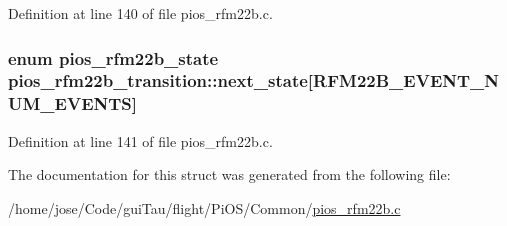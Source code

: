 Definition at line 140 of file pios\-\_\-rfm22b.\-c.

\hypertarget{structpios__rfm22b__transition_a0ad51f078fbfc8b875e6a26efe0b218b}{
\subsubsection[{next\-\_\-state}]{\setlength{\rightskip}{0pt plus 5cm}enum {\bf pios\-\_\-rfm22b\-\_\-state} pios\-\_\-rfm22b\-\_\-transition\-::next\-\_\-state\mbox{[}{\bf R\-F\-M22\-B\-\_\-\-E\-V\-E\-N\-T\-\_\-\-N\-U\-M\-\_\-\-E\-V\-E\-N\-T\-S}\mbox{]}}}\label{structpios__rfm22b__transition_a0ad51f078fbfc8b875e6a26efe0b218b}


Definition at line 141 of file pios\-\_\-rfm22b.\-c.



The documentation for this struct was generated from the following file\-:\begin{DoxyCompactItemize}
\item 
/home/jose/\-Code/gui\-Tau/flight/\-Pi\-O\-S/\-Common/\hyperlink{pios__rfm22b_8c}{pios\-\_\-rfm22b.\-c}\end{DoxyCompactItemize}
